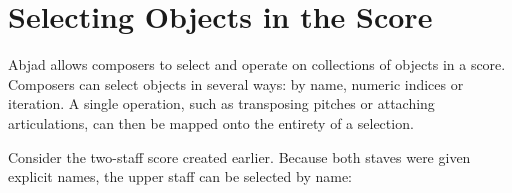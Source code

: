 \documentclass{article}
\begin{document}

\section{Selecting Objects in the Score} \label{sec:selection-flexibility}

Abjad allows composers to select and operate on collections of
objects in a score. Composers can select objects in several
ways: by name, numeric indices or iteration.
A single operation, such as transposing pitches or attaching articulations,
can then be mapped onto the entirety of a selection.

\noindent Consider the two-staff score created earlier. Because both staves were given
explicit names, the upper staff can be selected by name:

\end{document}
